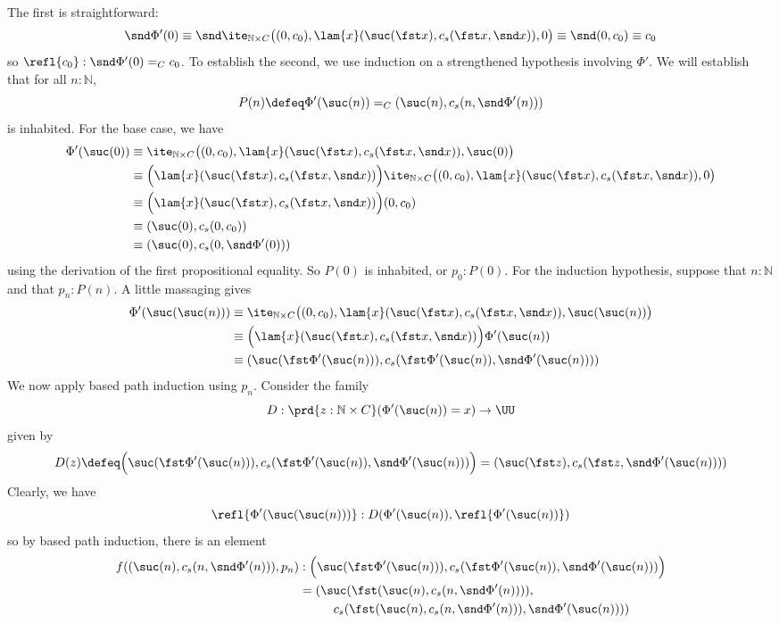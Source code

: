 The first is straightforward:
\[
\snd \Phi'(0)
\equiv
\snd\ite_{\mathbb{N} \times C}\big(
(0, c_{0}),
\lam{x}(\suc(\fst x), c_{s}(\fst x, \snd x)),
0
\big)
\equiv
\snd(0, c_{0})
\equiv
c_{0}
\]
so $\refl{c_{0}} : \snd\Phi'(0) =_{C} c_{0}$.  To establish the second, we use
induction on a strengthened hypothesis involving $\Phi'$.  We will establish
that for all $n : \mathbb{N}$,
\[
  P(n) \defeq 
  \Phi'(\suc(n)) =_{C} (\suc(n), c_{s}(n, \snd\Phi'(n)))
\]
is inhabited.
For the base case, we have
\begin{align*}
\Phi'(\suc(0)) &\equiv 
\ite_{\mathbb{N} \times C}\big(
(0, c_{0}),
\lam{x}(\suc(\fst x), c_{s}(\fst x, \snd x)),
\suc(0)
\big)
\\&\equiv
\Big(\lam{x}(\suc(\fst x), c_{s}(\fst x, \snd x))\Big)
\ite_{\mathbb{N} \times C}\big(
(0, c_{0}),
\lam{x}(\suc(\fst x), c_{s}(\fst x, \snd x)),
0
\big)
\\&\equiv
\Big(\lam{x}(\suc(\fst x), c_{s}(\fst x, \snd x))\Big)
(0, c_{0})
\\&\equiv
(\suc(0), c_{s}(0, c_{0}))
\\&\equiv
(\suc(0), c_{s}(0, \snd\Phi'(0)))
\end{align*}
using the derivation of the first propositional equality.  So $P(0)$ is
inhabited, or $p_{0} : P(0)$.  For the induction
hypothesis, suppose that $n : \mathbb{N}$ and that $p_{n} : P(n)$.  A little
massaging gives
\begin{align*}
  \Phi'(\suc(\suc(n)))
  &\equiv
   \ite_{\mathbb{N} \times C}\big(
     (0, c_{0}),
     \lam{x}(\suc(\fst x), c_{s}(\fst x, \snd x)),
     \suc(\suc(n))
   \big)
   \\&\equiv
   \Big(\lam{x}(\suc(\fst x), c_{s}(\fst x, \snd x))\Big) \Phi'(\suc(n))
   \\&\equiv
   (\suc(\fst \Phi'(\suc(n))), c_{s}(\fst \Phi'(\suc(n)), \snd \Phi'(\suc(n)))) 
\end{align*}
We now apply based path induction using $p_{n}$.  Consider the family
\[
  D : \prd{z:\mathbb{N} \times C}(\Phi'(\suc(n)) = x) \to \UU
\]
given by
\[
D(z) \defeq 
\Big(\suc(\fst \Phi'(\suc(n))), c_{s}(\fst \Phi'(\suc(n)), \snd
\Phi'(\suc(n)))\Big) 
=
(\suc(\fst z), c_{s}(\fst z, \snd \Phi'(\suc(n)))) 
\]
Clearly, we have
\[
\refl{\Phi'(\suc(\suc(n)))} : D(\Phi'(\suc(n)), \refl{\Phi'(\suc(n))})
\]
so by based path induction, there is an element
\begin{align*}
  f((\suc(n), c_{s}(n, \snd\Phi'(n))), p_{n}) &:
\Big(\suc(\fst \Phi'(\suc(n))), c_{s}(\fst \Phi'(\suc(n)), \snd
\Phi'(\suc(n)))\Big) 
\\&=
(\suc(\fst (\suc(n), c_{s}(n, \snd\Phi'(n)))),
\\&\phantom{---}
c_{s}(\fst (\suc(n), c_{s}(n,
\snd\Phi'(n))), \snd\Phi'(\suc(n)))) 
\end{align*}

